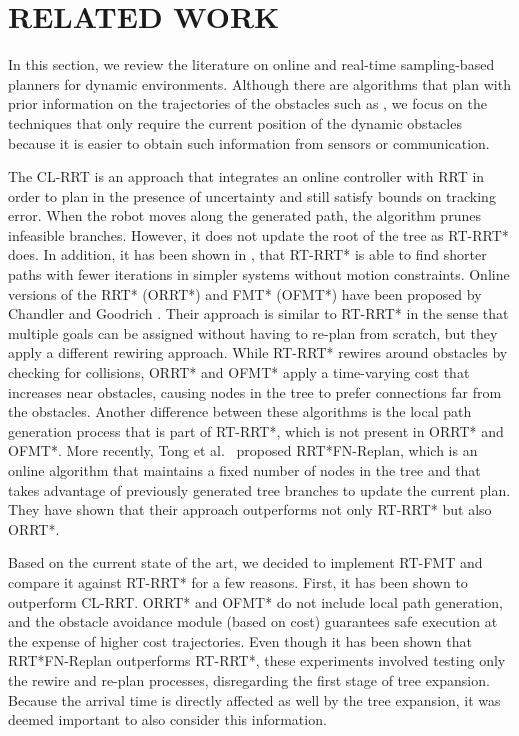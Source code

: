 \section{RELATED WORK}
\label{sec:related}
In this section, we review the literature on online and real-time sampling-based planners for dynamic environments. Although there are algorithms that plan with prior information on the trajectories of the obstacles such as \cite{grothe2022st}, we focus on the techniques that only require the current position of the dynamic obstacles because it is easier to obtain such information from sensors or communication.

The CL-RRT \cite{luders2010bounds} is an approach that integrates an online controller with RRT in order to plan in the presence of uncertainty and still satisfy bounds on tracking error. When the robot moves along the generated path, the algorithm prunes infeasible branches. However, it does not update the root of the tree as RT-RRT* does. In addition, it has been shown in \cite{naderi2015rt}, that RT-RRT* is able to find shorter paths with fewer iterations in simpler systems without motion constraints. Online versions of the RRT* (ORRT*) and FMT* (OFMT*) have been proposed by Chandler and Goodrich \cite{chandler2017online}. Their approach is similar to RT-RRT* in the sense that multiple goals can be assigned without having to re-plan from scratch, but they apply a different rewiring approach. While RT-RRT* rewires around obstacles by checking for collisions, ORRT* and OFMT* apply a time-varying cost that increases near obstacles, causing nodes in the tree to prefer connections far from the obstacles. Another difference between these algorithms is the local path generation process that is part of RT-RRT*, which is not present in ORRT* and OFMT*. More recently, Tong et al.\ \cite{tong2019rrt} proposed RRT*FN-Replan, which is an online algorithm that maintains a fixed number of nodes in the tree and that takes advantage of previously generated tree branches to update the current plan. They have shown that their approach outperforms not only RT-RRT* but also ORRT*. 

Based on the current state of the art, we decided to implement RT-FMT and compare it against RT-RRT* for a few reasons. First, it has been shown to outperform CL-RRT. ORRT* and OFMT* do not include local path generation, and the obstacle avoidance module (based on cost) guarantees safe execution at the expense of higher cost trajectories. Even though it has been shown that RRT*FN-Replan outperforms RT-RRT*, these experiments involved testing only the rewire and re-plan processes, disregarding the first stage of tree expansion. Because the arrival time is directly affected as well by the tree expansion, it was deemed important to also consider this information.